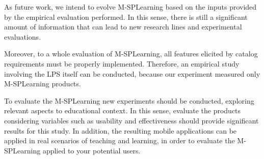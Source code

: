 As future work, we intend to evolve M-SPLearning based on the inputs provided by the empirical evaluation performed. In this sense, there is still a significant amount of information that can lead to new research lines and experimental evaluations.

Moreover, to a whole evaluation of M-SPLearning, all features elicited by catalog requirements must be properly implemented. Therefore, an empirical study involving the LPS itself can be conducted, because our experiment measured only M-SPLearning products.


To evaluate the M-SPLearning new experiments should be conducted, exploring relevant  aspects to educational context. In this sense, evaluate the products considering variables such as usability and effectiveness should provide significant results for this study. In addition, the resulting mobile applications can be applied in real scenarios of teaching and learning, in order to evaluate the M-SPLearning applied to your potential users.

